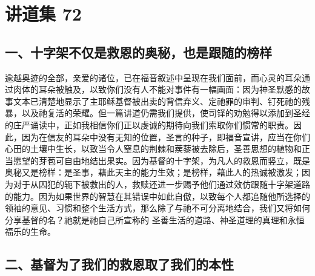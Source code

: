 

\section{讲道集 72}

\par


\subsection{一、十字架不仅是救恩的奥秘，也是跟随的榜样}

逾越奥迹的全部，亲爱的诸位，已在福音叙述中呈现在我们面前，而心灵的耳朵通过肉体的耳朵被触及，以致你们没有人不能对事件有一幅画面：因为神圣默感的故事文本已清楚地显示了主耶稣基督被出卖的背信弃义、定祂罪的审判、钉死祂的残暴，以及祂复活的荣耀。但一篇讲道仍需我们提供，使司铎的劝勉得以添加到圣经的庄严诵读中，正如我相信你们正以虔诚的期待向我们索取你们惯常的职责。因此，因为在信友的耳朵中没有无知的位置，圣言的种子，即福音宣讲，应当在你们心田的土壤中生长，以致当令人窒息的荆棘和蒺藜被去除后，圣善思想的植物和正当愿望的芽苞可自由地结出果实。因为基督的十字架，为凡人的救恩而竖立，既是奥秘又是榜样：是圣事，藉此天主的能力生效；是榜样，藉此人的热诚被激发；因为对于从囚犯的轭下被救出的人，救赎还进一步赐予他们通过效仿跟随十字架道路的能力。因为如果世界的智慧在其错误中如此自傲，以致每个人都追随他所选择的领袖的意见、习惯和整个生活方式，那么除了与祂不可分离地结合，我们又将如何分享基督的名？祂就是祂自己所宣称的 圣善生活的道路、神圣道理的真理和永恒福乐的生命。\par


\subsection{二、基督为了我们的救恩取了我们的本性}

